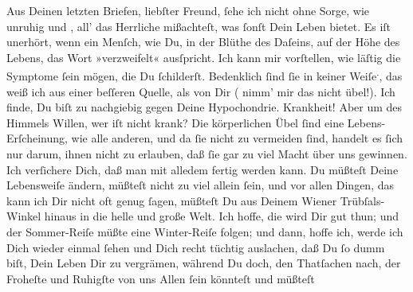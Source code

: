 \pstart
           Aus Deinen letzten Briefen, liebſter Freund,{ }ſehe ich nicht ohne Sorge, wie {\pb}unruhig und \label{K_L02848-2v}\label{K_L02848-2}, all’ das Herrliche mißachteſt, was{ }ſonſt Dein
               Leben bietet. Es iſt unerhört, wenn ein Menſch, wie Du, in der Blüthe des Daſeins,
               auf der Höhe des Lebens, das Wort »verzweifelt« ausſpricht. Ich kann mir vorſtellen,
               wie läſtig die Symptome{ }ſein mögen, die Du{ }ſchilderſt. Bedenklich{ }ſind{ }ſie in keiner Weiſe\substVorne{}\textsuperscript{.}\substDazwischen{},\substHinten{} das weiß ich aus einer beſſeren Quelle, als von Dir {\pb}( nimm’ mir das
               nicht übel!). Ich finde, Du biſt zu nachgiebig gegen Deine Hypochondrie. Krankheit!
               Aber um des Himmels Willen, wer iſt nicht krank? Die körperlichen Übel{ }ſind eine
               Lebens-Erſcheinung, wie alle anderen, und da{ }ſie nicht zu vermeiden{ }ſind, handelt es{ }ſich nur darum, ihnen nicht zu erlauben, daß{ }ſie gar zu viel Macht  über uns gewinnen. Ich verſichere Dich, daß man mit
               alledem fertig werden kann. Du müßteſt {\pb}Deine
               Lebensweiſe ändern, müßteſt nicht zu viel allein{ }ſein, und vor allen Dingen, das kann
               ich Dir nicht oft genug{ }ſagen, müßteſt Du aus Deinem Wiener Trübſals-Winkel hinaus in die helle und große Welt. Ich hoffe, die
                  \label{K_L02848-3v}\label{K_L02848-3} wird Dir gut thun; und der Sommer-Reiſe müßte eine Winter-Reiſe folgen; und
               dann, hoffe ich, werde ich Dich wieder einmal{ }ſehen {\pb}und Dich recht tüchtig auslachen, daß Du{ }ſo  dumm
               biſt, Dein Leben Dir zu vergrämen, während Du doch, den Thatſachen nach, der Froheſte
               und Ruhigſte von uns Allen{ }ſein könnteſt und müßteſt{\dotsseven}\pend
           
